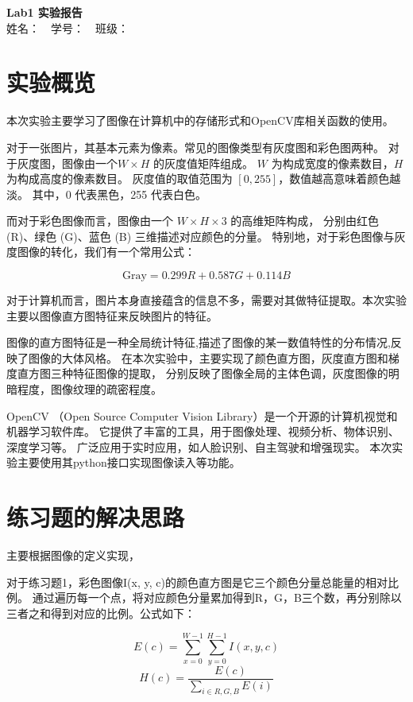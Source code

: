 \documentclass{article}
\begin{document}
\begin{center}
    \Large \textbf{Lab1 实验报告}\\
    \vspace{1em}
    姓名：~~学号：~~班级：
\end{center}

\section{实验概览}
    本次实验主要学习了图像在计算机中的存储形式和OpenCV库相关函数的使用。

    对于一张图片，其基本元素为像素。常见的图像类型有灰度图和彩色图两种。
    对于灰度图，图像由一个\( W \times H \) 的灰度值矩阵组成。
    \( W \) 为构成宽度的像素数目，\( H \) 为构成高度的像素数目。
    灰度值的取值范围为 \([0, 255]\)，数值越高意味着颜色越淡。
    其中，0 代表黑色，255 代表白色。

    而对于彩色图像而言，图像由一个 \( W \times H \times 3 \) 的高维矩阵构成，
    分别由红色 (R)、绿色 (G)、蓝色 (B) 三维描述对应颜色的分量。
    特别地，对于彩色图像与灰度图像的转化，我们有一个常用公式：

\[
\text{Gray} = 0.299R + 0.587G + 0.114B
\]

    对于计算机而言，图片本身直接蕴含的信息不多，需要对其做特征提取。本次实验主要以图像直方图特征来反映图片的特征。

    图像的直方图特征是一种全局统计特征,描述了图像的某一数值特性的分布情况,反映了图像的大体风格。
    在本次实验中，主要实现了颜色直方图，灰度直方图和梯度直方图三种特征图像的提取，
    分别反映了图像全局的主体色调，灰度图像的明暗程度，图像纹理的疏密程度。

    OpenCV （Open Source Computer Vision Library）是一个开源的计算机视觉和机器学习软件库。
    它提供了丰富的工具，用于图像处理、视频分析、物体识别、深度学习等。
    广泛应用于实时应用，如人脸识别、自主驾驶和增强现实。
    本次实验主要使用其python接口实现图像读入等功能。
    
\section{练习题的解决思路}
    主要根据图像的定义实现，

    对于练习题1，彩色图像I(x, y, c)的颜色直方图是它三个颜色分量总能量的相对比例。
    通过遍历每一个点，将对应颜色分量累加得到R，G，B三个数，再分别除以三者之和得到对应的比例。公式如下：

    \[E(c) = \sum_{x = 0}^{W - 1} \sum_{y = 0}^{H - 1}I(x, y, c) \]
    \[H(c) = \frac{E(c)}{\sum\limits_{i\in {R,G,B}}^{} E(i)}\]
\end{document}
